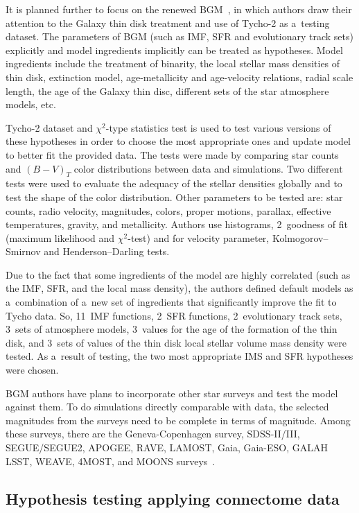 \begin{multicols}{2}
  It is planned further to focus on the renewed BGM~\cite{57-kl}, in which authors
draw their attention to the Galaxy thin disk treatment and use of Tycho-2 as a~testing
dataset. The parameters of BGM (such as IMF, SFR and evolutionary track sets)
explicitly and model ingredients implicitly can be treated as hypotheses. Model
ingredients include the treatment of binarity, the local stellar mass densities of thin
disk, extinction model,  age-metallicity and age-velocity relations, radial scale length,
the age of the Galaxy thin disc, different sets of the star atmosphere models, etc.

  Tycho-2 dataset  and $\chi^2$-type statistics test is used to test various versions of
these hypotheses in order to choose the most appropriate ones and update model to
better fit the provided data. The tests were made by comparing star counts and
  $(B-V)_T$ color distributions between data and simulations. Two different tests
were used to evaluate the adequacy of the stellar densities globally and to test the
shape of the color distribution. Other parameters to be tested are: star counts, radio
velocity, magnitudes, colors, proper motions, parallax, effective temperatures,
gravity, and metallicity. Authors use histograms, 2~goodness of fit (maximum
likelihood and $\chi^2$-test) and for velocity parameter, Kolmogorov--Smirnov
and Henderson--Darling tests.

  Due to the fact that some ingredients of the model are highly correlated (such as
the IMF, SFR, and the local mass density), the authors defined default models as a~combination of a~new set of ingredients that significantly improve the fit to Tycho
data.  So, 11~IMF functions, 2~SFR functions, 2~evolutionary track sets, 3~sets of
atmosphere models, 3~values for the age of the formation of the thin disk,
and 3~sets of
values of the thin disk local stellar volume mass density were tested.
As a~result of
testing, the two most appropriate IMS and SFR hypotheses were chosen.


  BGM authors have plans to incorporate other star surveys and test the model
against them. To do simulations directly comparable with data, the selected
magnitudes from the surveys need to be complete in terms of magnitude. Among
these surveys, there are the Geneva-Copenhagen survey, SDSS-II/III,
SEGUE/SEGUE2, APOGEE, RAVE, LAMOST, Gaia, Gaia-ESO, GALAH LSST,
WEAVE, 4MOST, and \mbox{MOONS} surveys~\cite{61-kl}.

\subsection{Hypothesis testing applying connectome data }


\end{multicols}
